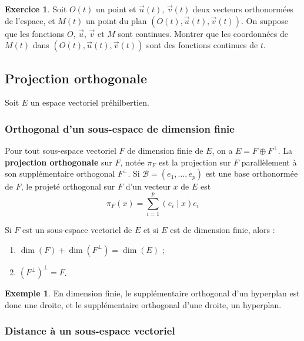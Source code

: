 \documentclass[french]{article}
\theoremstyle{plain}
\theoremstyle{definition}
\newtheorem*{ex}{Exemple}
\newtheorem{exo}{Exercice}
\theoremstyle{remark}
\begin{document}
\begin{exo}
	Soit $O(t)$ un point et $\overrightarrow{u}(t)$, $\overrightarrow{v}(t)$ deux vecteurs orthonormées de l'espace, et $M(t)$ un point du plan $(O(t),\overrightarrow{u}(t),\overrightarrow{v}(t))$. On suppose que les fonctions $O$, $\overrightarrow{u}$, $\overrightarrow{v}$ et $M$ sont continues. Montrer que les coordonnées de $M(t)$ dans $(O(t),\overrightarrow{u}(t),\overrightarrow{v}(t))$ sont des fonctions continues de $t$.
\end{exo}

\subsection{Projection orthogonale}

Soit $E$ un espace vectoriel préhilbertien.

\subsubsection*{Orthogonal d'un sous-espace de dimension finie}

\begin{thm}{}
	Pour tout sous-espace vectoriel $F$ de dimension finie de $E$, on a $E=F\oplus F^\bot$. La \textbf{projection orthogonale} sur $F$, notée $\pi_F$ est la projection sur $F$ parallèlement à son supplémentaire orthogonal $F^\bot$. Si $\mathcal{B}=(e_1,\ldots,e_p)$ est une base orthonormée de $F$, le projeté orthogonal sur $F$ d'un vecteur $x$ de $E$ est $$\pi_F(x)=\sum_{i=1}^{p}(e_i\mid x)e_i$$
\end{thm}

\begin{thm}{}
	Si $F$ est un sous-espace vectoriel de $E$ et si $E$ est de dimension finie, alors :
	\begin{enumerate}
		\item $\dim(F)+\dim(F^\bot)=\dim(E)$ ;
		\item $(F^\bot)^\bot=F$.
	\end{enumerate}
\end{thm}

\begin{ex}
	En dimension finie, le supplémentaire orthogonal d'un hyperplan est donc une droite, et le supplémentaire orthogonal d'une droite, un hyperplan.
\end{ex}

\subsubsection*{Distance à un sous-espace vectoriel}
\end{document}

